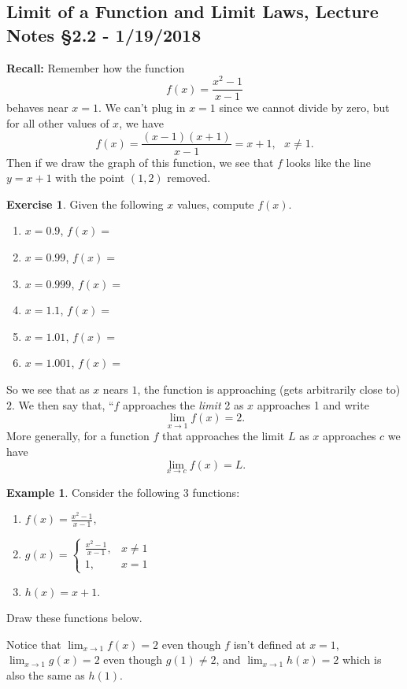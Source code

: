 \documentclass[leqno]{article}
\theoremstyle{definition}
\newtheorem{example}{Example}[section]
\newtheorem{exercise}{Exercise}[section]
\theoremstyle{remark}
\theoremstyle{theorem}
\begin{document}
\subsection{Limit of a Function and Limit Laws, Lecture Notes \S 2.2 - 1/19/2018}

\noindent \textbf{Recall:} Remember how the function 
\[
f(x)=\frac{x^2-1}{x-1}
\]
behaves near $x=1$.  We can't plug in $x=1$ since we cannot divide by zero, but for all other values of $x$, we have
\[
f(x)=\frac{(x-1)(x+1)}{x-1}=x+1, ~~~ x\neq 1.
\]
Then if we draw the graph of this function, we see that $f$ looks like the line $y=x+1$ with the point $(1,2)$ removed.
\vspace*{4cm}

\begin{exercise}
Given the following $x$ values, compute $f(x)$.  
\begin{enumerate}[1.]
\item $x=0.9$, $f(x)=$
\item $x=0.99$, $f(x)=$
\item $x=0.999$, $f(x)=$
\item $x=1.1$, $f(x)=$
\item $x=1.01$, $f(x)=$
\item $x=1.001$, $f(x)=$
\end{enumerate}
\end{exercise}
So we see that as $x$ nears $1$, the function is approaching (gets arbitrarily close to) $2$. We then say that, ``$f$ approaches the \emph{limit} 2 as $x$ approaches 1 and write
\[
\lim_{x\to 1} f(x)=2.
\]
More generally, for a function $f$  that approaches the limit $L$ as $x$ approaches $c$ we have
\[
\lim_{x\to c} f(x) = L.
\]

\begin{example}
Consider the following 3 functions:
\begin{enumerate}[1.]
\item $f(x)=\frac{x^2-1}{x-1}$,
\item $g(x)=
\begin{cases}
\frac{x^2-1}{x-1}, & x\neq 1\\
1, & x=1
\end{cases}$
\item $h(x)=x+1$.
\end{enumerate}
Draw these functions below. 
\vspace*{4cm}

Notice that $\lim_{x\to 1} f(x) = 2$ even though $f$ isn't defined at $x=1$, $\lim_{x\to 1} g(x)=2$ even though $g(1)\neq 2$, and $\lim_{x\to 1} h(x)=2$ which is also the same as $h(1)$.
\end{example}
\end{document}
